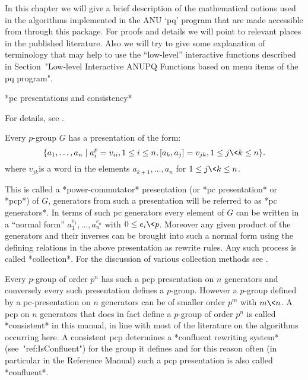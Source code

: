 

In this chapter  we will give a brief  description of the mathematical
notions used in the algorithms  implemented in the ANU `pq' program
that are made accessible from {\GAP} through this package.  For proofs
and  details  we  will  point  to relevant  places  in  the  published
literature.  Also we will try  to give some explanation of terminology
that may help to use the ``low-level'' interactive functions described
in Section~"Low-level Interactive ANUPQ  Functions based on menu items
of the pq program".


*pc presentations and consistency*

For details, see \cite{NNN98}.

Every $p$-group $G$ has a presentation of the form: 
$$ 
\{a_1,\dots, a_n \mid a_i^p = v_{ii}, 1 \le i \le n, 
                   [a_k, a_j] = v_{jk}, 1 \le j \< k \le n \}.  
$$
where $v_{jk}$is a word in the elements $a_{k+1},\dots,a_n$ for 
$1 \le j \< k \le n$.

This is  called a *power-commutator*  presentation (or *pc presentation*
or *pcp*) of $G$, generators from  such a presentation will be referred
to as *pc generators*.  In terms of such pc generators every element
of $G$  can be written in a  ``normal form'' $a_1^{e_1},\dots,a_n^{e_n}$
with $0 \le  e_i \< p$.  Moreover any given  product of the generators
and  their inverses can  be brought  into such a  normal form  using the
defining  relations in the  above presentation  as rewrite  rules. Any
such process is called  *collection*.  For the discussion of various
collection methods see \cite{LGS90}.

Every  $p$-group of order  $p^n$ has  such a  pcp presentation  on $n$
generators and conversely every such presentation defines a $p$-group.
However a $p$-group defined by a pc-presentation on $n$ generators can
be of  smaller order $p^m$ with  $m\<n$. A pcp on  $n$ generators that
does  in   fact  define   a  $p$-group  of   order  $p^n$   is  called
*consistent* in this  manual, in line with most  of the literature on
the  algorithms  occurring  here.  A  consistent  pcp   determines   a
*confluent rewriting system* (see~"ref:IsConfluent") for the group  it
defines and for  this  reason  often  (in  particular  in  the  {\GAP}
Reference  Manual)  such   a   pcp   presentation   is   also   called
*confluent*.

